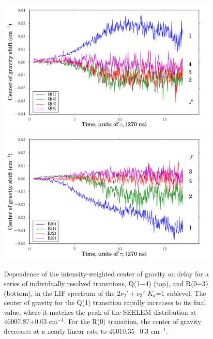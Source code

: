 \documentclass[12pt]{mitthesis}
\newcommand{\rcm}{cm$^{-1}$}
\begin{document}
\begin{figure}
  \caption{Dependence of the intensity-weighted center of gravity on
    delay for a series of individually resolved transitions, Q(1$-$4)
    (top), and R(0$-$3) (bottom), in the LIF spectrum of the
    $2\nu_2'+\nu_3'$ $K_a$=1 sublevel.  The center of gravity for the
    Q(1) transition rapidly increases to its final value, where it
    matches the peak of the SEELEM distribution at 46007.87$+$0.03
    \rcm.  For the R(0) transition, the center of gravity decreases at
    a nearly linear rate to 46010.35$-$0.3 \rcm.}
  \label{fig:2231-cog-delay}
  \centering
  \vspace{5mm}
  \includegraphics[width=6in]{2231-q1234-cog-delay.pdf}
  \includegraphics[width=6in]{2231-r0123-cog-delay.pdf}
\end{figure}
\end{document}
